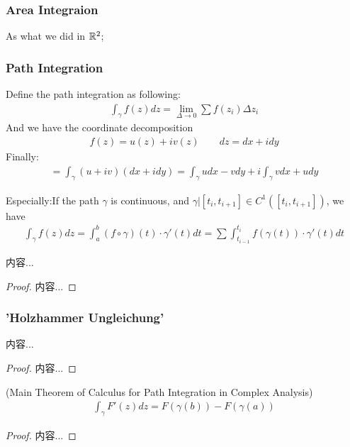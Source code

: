 \documentclass[Total.tex]{subfiles}
\begin{document}
				\subsubsection{Area Integraion}
					As what we did in $\mathbb{R}^2$;
				\subsubsection{Path Integration}
					Define the path integration as following:
					\begin{gather*}
						\int_\gamma f(z)dz=\lim_{\Delta\rightarrow 0} \sum f(z_i)\Delta z_i
					\end{gather*}
					And we have the coordinate decomposition
					\begin{gather*}
						f(z)=u(z)+iv(z)\qquad dz=dx+idy
					\end{gather*}
					Finally:
					\begin{gather*}
						=\int_\gamma (u+iv)(dx+idy)=\int_\gamma udx-vdy+i\int_\gamma vdx+udy
					\end{gather*}
					
					Especially:If the path $\gamma$ is continuous, and $\gamma|[t_i,t_{i+1}]\in C^1([t_i,t_{i+1}])$, we have
					\begin{gather*}
						\int_\gamma f(z)dz=\int_a^b (f\circ\gamma)(t)\cdot \gamma'(t)dt=\sum \int_{t_{i-1}}^{t_i} f(\gamma(t))\cdot \gamma'(t)dt
					\end{gather*}
					\begin{example}
						
					\end{example}
					
					\begin{proposition}
						内容...
					\end{proposition}
					\begin{proof}
						内容...
					\end{proof}
					
				\subsubsection{'Holzhammer Ungleichung'}
					\begin{proposition}
						内容...
					\end{proposition}
					\begin{proof}
						内容...
					\end{proof}
					
					\begin{proposition}
						(Main Theorem of Calculus for Path Integration in Complex Analysis) 
						\begin{gather*}
							\int_\gamma F'(z)dz=F(\gamma(b))-F(\gamma(a))
						\end{gather*}
					\end{proposition}
					\begin{proof}
						内容...
					\end{proof}
\end{document}
